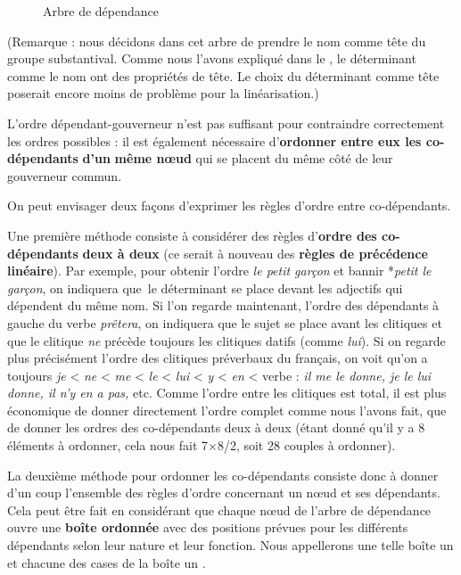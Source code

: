 \begin{figure}

\caption{\label{fig:}Arbre de dépendance}

\end{figure}

 (Remarque : nous décidons dans cet arbre de prendre le nom comme tête du groupe substantival. Comme nous l’avons expliqué dans le , le déterminant comme le nom ont des propriétés de tête. Le choix du déterminant comme tête poserait encore moins de problème pour la linéarisation.)

L’ordre dépendant-gouverneur n’est pas suffisant pour contraindre correctement les ordres possibles : il est également nécessaire d’\textbf{ordonner entre eux les co-dépendants} \textbf{d’un} \textbf{même nœud} qui se placent du même côté de leur gouverneur commun.

On peut envisager deux façons d’exprimer les règles d’ordre entre co-dépendants.

Une première méthode consiste à considérer des règles d’\textbf{ordre des co-dépendants} \textbf{deux à deux} (ce serait à nouveau des \textbf{règles de précédence linéaire}). Par exemple, pour obtenir l’ordre \textit{le petit garçon} et bannir *\textit{petit le garçon}, on indiquera que~le déterminant se place devant les adjectifs qui dépendent du même nom. Si l’on regarde maintenant, l’ordre des dépendants à gauche du verbe \textit{prêtera}, on indiquera que le sujet se place avant les clitiques et que le clitique \textit{ne} précède toujours les clitiques datifs (comme \textit{lui}). Si on regarde plus précisément l’ordre des clitiques préverbaux du français, on voit qu’on a toujours \textit{je} < \textit{ne} < \textit{me} < \textit{le} < \textit{lui} < \textit{y} < \textit{en} < verbe : \textit{il me le donne, je le lui donne, il n’y en a pas,} etc. Comme l’ordre entre les clitiques est total, il est plus économique de donner directement l’ordre complet comme nous l’avons fait, que de donner les ordres des co-dépendants deux à deux (étant donné qu’il y a 8 éléments à ordonner, cela nous fait 7${\times}$8/2, soit 28 couples à ordonner).

La deuxième méthode pour ordonner les co-dépendants consiste donc à donner d’un coup l’ensemble des règles d’ordre concernant un nœud et ses dépendants. Cela peut être fait en considérant que chaque nœud de l’arbre de dépendance ouvre une \textbf{boîte ordonnée} avec des positions prévues pour les différents dépendants selon leur nature et leur fonction. Nous appellerons une telle boîte un  et chacune des cases de la boîte un .

